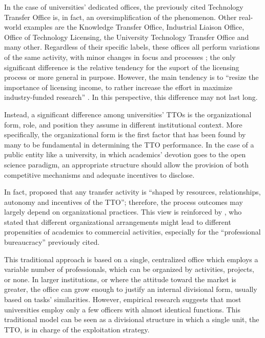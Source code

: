 In the case of universities' dedicated offices, the previously cited Technology Transfer Office is, in fact, an oversimplification of the phenomenon. Other real-world examples are the Knowledge Transfer Office, Industrial Liaison Office, Office of Technology Licensing, the University Technology Transfer Office and many other. Regardless of their specific labels, these offices all perform variations of the same activity, with minor changes in focus and processes \citep{Brescia2016}; the only significant difference is the relative tendency for the suport of the licensing process or more general in purpose. However, the main tendency is to \enquote{resize the importance of licensing income, to rather increase the effort in maximize industry-funded research} \citep{Balderi2010}. In this perspective, this difference may not last long. 

Instead, a significant difference among universities' TTOs is the organizational form, role, and position they assume in different institutional context. More specifically, the organizational form is the first factor that has been found by many to be fundamental in determining the TTO performance. In the case of a public entity like a university, in which academics' devotion goes to the open science paradigm, an appropriate structure should allow the provision of both competitive mechanisms and adequate incentives to disclose. 

In fact, \citet{Bercovitz2001} proposed that any transfer activity is \enquote{shaped by resources, relationships, autonomy and incentives of the TTO}; therefore, the process outcomes may largely depend on organizational practices. This view is reinforced by \citet{Debackere2005}, who stated that different organizational arrangements might lead to different propensities of academics to commercial activities, especially for the \enquote{professional bureaucracy} previously cited. 

This traditional approach is based on a single, centralized office which employs a variable number of professionals, which can be organized by activities, projects, or none. In larger institutions, or where the attitude toward the market is greater, the office can grow enough to justify an internal divisional form, usually based on tasks' similarities. However, empirical research suggests that most universities employ only a few officers with almost identical functions. This traditional model can be seen as a divisional structure in which a single unit, the TTO, is in charge of the exploitation strategy. 

